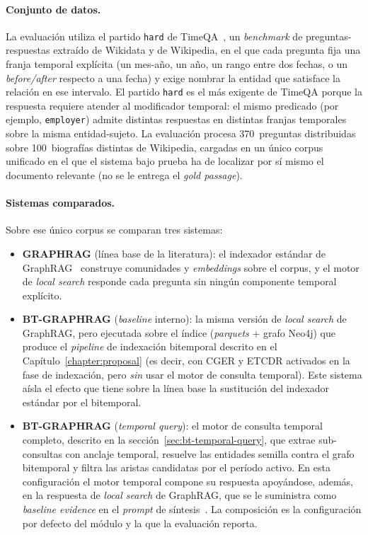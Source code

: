 \paragraph{Conjunto de datos.} La evaluación utiliza el partido \texttt{hard} de TimeQA~\cite{TODO_timeqa}, un \emph{benchmark} de preguntas-respuestas extraído de Wikidata y de Wikipedia, en el que cada pregunta fija una franja temporal explícita (un mes-año, un año, un rango entre dos fechas, o un \emph{before/after} respecto a una fecha) y exige nombrar la entidad que satisface la relación en ese intervalo. El partido \texttt{hard} es el más exigente de TimeQA porque la respuesta requiere atender al modificador temporal: el mismo predicado (por ejemplo, \texttt{employer}) admite distintas respuestas en distintas franjas temporales sobre la misma entidad-sujeto. La evaluación procesa 370~preguntas distribuidas sobre 100~biografías distintas de Wikipedia, cargadas en un único corpus unificado en el que el sistema bajo prueba ha de localizar por sí mismo el documento relevante (no se le entrega el \emph{gold passage}).

\paragraph{Sistemas comparados.} Sobre ese único corpus se comparan tres sistemas:

\begin{itemize}
\item \textbf{GRAPHRAG} (línea base de la literatura): el indexador estándar de GraphRAG~\cite{TODO_graphrag} construye comunidades y \emph{embeddings} sobre el corpus, y el motor de \emph{local search} responde cada pregunta sin ningún componente temporal explícito.
\item \textbf{BT-GRAPHRAG} (\emph{baseline} interno): la misma versión de \emph{local search} de GraphRAG, pero ejecutada sobre el índice (\emph{parquets} + grafo Neo4j) que produce el \emph{pipeline} de indexación bitemporal descrito en el Capítulo~\ref{chapter:proposal} (es decir, con CGER y ETCDR activados en la fase de indexación, pero \emph{sin} usar el motor de consulta temporal). Este sistema aísla el efecto que tiene sobre la línea base la sustitución del indexador estándar por el bitemporal.
\item \textbf{BT-GRAPHRAG} (\emph{temporal query}): el motor de consulta temporal completo, descrito en la sección~\ref{sec:bt-temporal-query}, que extrae sub-consultas con anclaje temporal, resuelve las entidades semilla contra el grafo bitemporal y filtra las aristas candidatas por el período activo. En esta configuración el motor temporal compone su respuesta apoyándose, además, en la respuesta de \emph{local search} de GraphRAG, que se le suministra como \emph{baseline evidence} en el \emph{prompt} de síntesis~\cite{TODO_btg_compose}. La composición es la configuración por defecto del módulo y la que la evaluación reporta.
\end{itemize}

